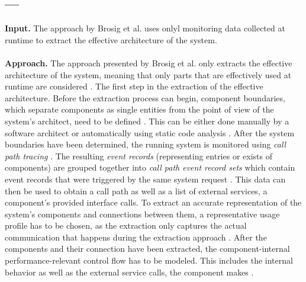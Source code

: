 \subsection{--- \cite{Brosig2011}}
\label{sec:Results:Brosig}
\textbf{Input.}
The approach by Brosig et al. uses onlyl monitoring data collected at runtime to extract the effective architecture \cite{Israr2007interaction} of the system.
\\ \\
\textbf{Approach.}
The approach presented by Brosig et al. only extracts the effective architecture \cite{Israr2007interaction} of the system, meaning that only parts that are effectively used at runtime are considered \cite{Brosig2011}.
The first step in the extraction of the effective architecture.
Before the extraction process can begin, component boundaries, which separate components as single entities from the point of view of the system's architect, need to be defined \cite{Brosig2011}.
This can be either done manually by a software architect or automatically using static code analysis \cite{Brosig2011}.
After the system boundaries have been determined, the running system is monitored using \textit{call path tracing} \cite{Brosig2011}.
The resulting \textit{event records} (representing entries or exists of components) are grouped together into \textit{call path event record sets} which contain event records that were triggered by the same system request \cite{Brosig2011}.
This data can then be used to obtain a call path \cite{Brosig2011} as well as a list of external services, a component's provided interface calls.
To extract an accurate representation of the system's components and connections between them, a representative usage profile has to be chosen, as the extraction only captures the actual communication that happens during the extraction approach \cite{Brosig2011}.
After the components and their connection have been extracted, the component-internal performance-relevant control flow has to be modeled.
This includes the internal behavior as well as the external service calls, the component makes \cite{Brosig2011}.


